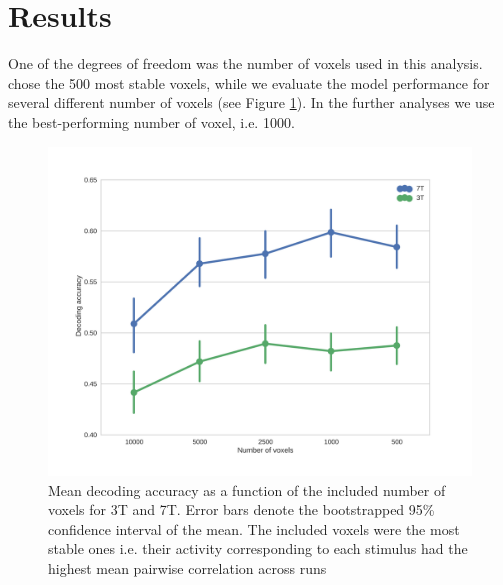 \section*{Results}

One of the degrees of freedom was the number of voxels used in this analysis. \cite{ML08} chose the 500 most stable voxels, while we evaluate the model performance for several different number of voxels (see Figure \ref{fig:voxelnr}). In the further analyses we use the best-performing number of voxel, i.e. 1000.
	
\begin{figure}
	\centering
	\includegraphics[width=\linewidth]{pics/nr_of_voxels_both}
	\caption{Mean decoding accuracy as a function of the included number of voxels for 3T and 7T. Error bars denote the bootstrapped 95\% confidence interval of the mean. The included voxels were the most stable ones i.e. their activity corresponding to each stimulus had the highest mean pairwise correlation across runs}
	\label{fig:voxelnr}
\end{figure}
 
 
 
